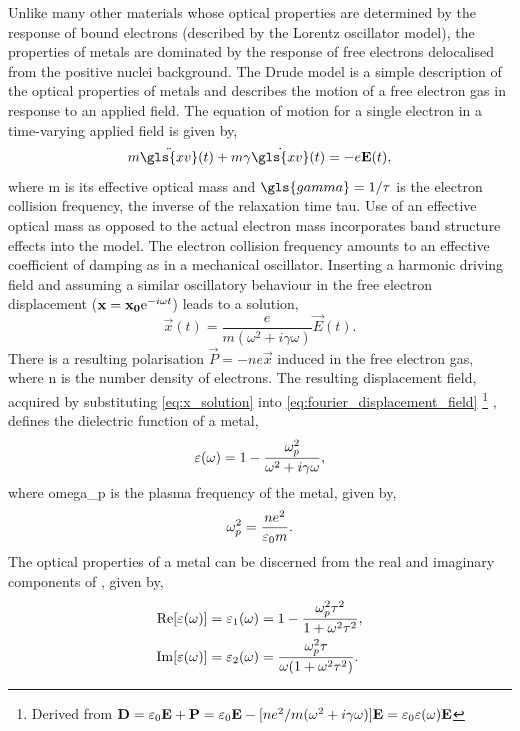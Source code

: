 \documentclass{article}
\begin{document}
Unlike many other materials whose optical properties are determined by the response of bound electrons (described by the Lorentz oscillator model), the properties of metals are dominated by the response of free electrons delocalised from the positive nuclei background. The Drude model \cite{drude1900} is a simple description of the optical properties of metals and describes the motion of a free electron gas in response to an applied field. The equation of motion for a single electron in a time-varying applied field is given by,
\begin{equation}
	m\ddot{\gls{xv}}(t) + m\gamma \dot{\gls{xv}}(t) = -e\vec{E}(t),
\end{equation}
where \gls{m} is its effective optical mass and $\gls{gamma} = 1/\tau$ is the electron collision frequency, the inverse of the relaxation time \gls{tau}. Use of an effective optical mass as opposed to the actual electron mass incorporates band structure effects into the model. The electron collision frequency amounts to an effective coefficient of damping as in a mechanical oscillator. Inserting a harmonic driving field and assuming a similar oscillatory behaviour in the free electron displacement ($\vec{x} = \vec{x_0}\e^{-i\omega t}$) leads to a solution,
\begin{equation}
	\vec{x}(t) = \frac{e}{m(\omega^2 + i\gamma\omega)}\vec{E}(t).
	\label{eq:x_solution}
\end{equation}
There is a resulting polarisation $\vec{P}=-ne\vec{x}$ induced in the free electron gas, where \gls{n} is the number density of electrons. The resulting displacement field, {\color{red}acquired} by substituting \eqref{eq:x_solution} into \eqref{eq:fourier_displacement_field}%
\footnote{Derived from $\vec{D}=\epsfs\vec{E} + \vec{P} = \epsfs\vec{E} - [ne^2/m(\omega^2 + i\gamma\omega)]\vec{E} = \epsfs\eps(\omega)\vec{E}$}
, defines the dielectric function of a metal,
\begin{equation}
	\eps(\omega) = 1 - \frac{\omegap[2]}{\omega^2 + i\gamma\omega},
\end{equation}
where \gls{omega_p} is the plasma frequency of the metal, given by,
\begin{equation}
	\omegap[2] = \frac{ne^2}{\varepsilon_0 m}.
	\label{eq:plasma_frequency}
\end{equation}
The optical properties of a metal can be discerned from the real and imaginary components of \dielectric, given by,
\begin{subequations}
	\begin{align}
	\real{\dielectric} = \eps_1(\omega) &= 1 - \frac{\omegap[2]\tau^2}{1+\omega^2\tau^2},\\
	\imag{\dielectric} = \eps_2(\omega) &= \frac{\omegap[2]\tau}{\omega(1+\omega^2\tau^2)}.
	\end{align}
\end{subequations}
\end{document}
